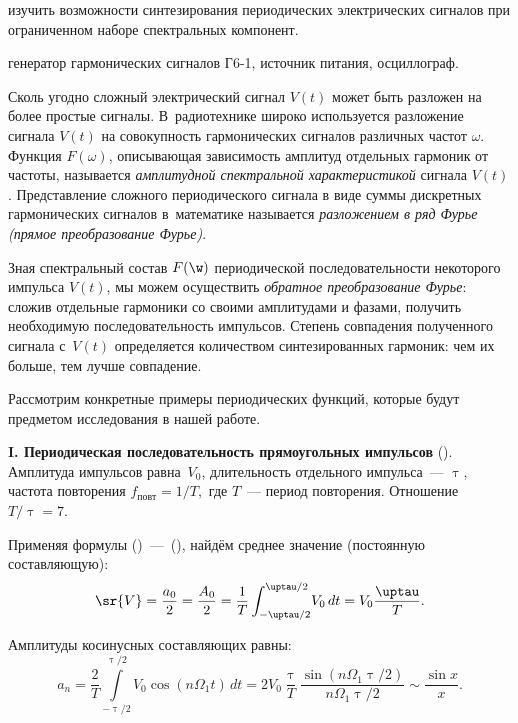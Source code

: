 
\begin{lab:aim}
	изучить возможности синтезирования периодических электрических сигналов при ограниченном наборе спектральных
компонент.
\end{lab:aim}

\begin{lab:equipment}
	генератор гармонических сигналов Г6-1, источник питания, осциллограф.
\end{lab:equipment}

Сколь угодно сложный электрический сигнал $V(t)$ может быть разложен на более простые сигналы. В~радиотехнике широко используется разложение сигнала $V(t)$ на совокупность гармонических сигналов различных частот $\omega$. Функция $F(\omega)$, описывающая зависимость амплитуд отдельных гармоник от частоты, называется \emph{амплитудной спектральной характеристикой} сигнала $V(t)$. Представление сложного периодического сигнала в виде суммы дискретных гармонических сигналов в~математике называется \emph{разложением в ряд Фурье (прямое преобразование Фурье)}.

Зная спектральный состав $F(\w)$ периодической последовательности некоторого импульса $V(t)$, мы можем осуществить \emph{обратное преобразование Фурье}: сложив отдельные гармоники со своими амплитудами и фазами, получить необходимую последовательность импульсов. Степень совпадения полученного сигнала с~$V(t)$ определяется количеством синтезированных гармоник: чем их больше, тем лучше совпадение.

Рассмотрим конкретные примеры периодических функций, которые будут предметом исследования в нашей работе.

{\bf I. Периодическая последовательность прямоугольных импульсов} (). Амплитуда импульсов равна~$V_0$, длительность
отдельного импульса~--- $\uptau$, частота повторения $f_{повт}=1/T,$ где $T$~--- период повторения. Отношение
$T/\uptau=7$.

Применяя формулы ()~---~(), найдём среднее значение (постоянную составляющую):
\begin{equation}
	\sr{V}=\frac{a_0}{2}=\frac{A_0}{2}= \frac{1}{T}\int_{-\uptau/2}^{\uptau/2} \!V_0\,dt=V_0\frac{\uptau}{T}.
\end{equation}

Амплитуды косинусных составляющих равны:
\begin{equation}
	a_n=\frac{2}{T}\int\limits_{-\uptau/2}^{\uptau/2} \!V_0\cos(n\Omega_1t)\,dt=2V_0\frac{\uptau}{T}\frac{\sin
(n\Omega_1\uptau/2)}{n\Omega_1\uptau/2} \sim \frac{\sin x}{x}.
\end{equation}

